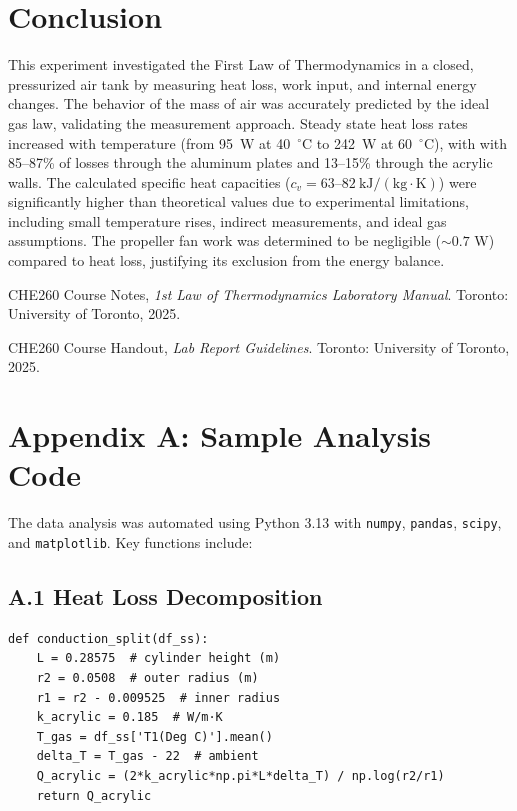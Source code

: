 \documentclass[12pt]{article}
\begin{document}
\section*{Conclusion}
This experiment investigated the First Law of Thermodynamics in a closed, pressurized air tank by measuring heat loss, work input, and internal energy changes.
The behavior of the mass of air was accurately predicted by the ideal gas law, validating the measurement approach.
Steady state heat loss rates increased with temperature (from 95~W at 40~$^{\circ}$C to 242~W at 60~$^{\circ}$C), with with 85--87\% of losses through the aluminum plates and 13--15\% through the acrylic walls.
The calculated specific heat capacities ($c_v = 63$--$82~\mathrm{kJ/(kg \cdot K)}$) were significantly higher than theoretical values due to experimental limitations, including small temperature rises, indirect measurements, and ideal gas assumptions.
The propeller fan work was determined to be negligible ($\sim 0.7$ W) compared to heat loss, justifying its exclusion from the energy balance.


\begin{thebibliography}{9}
CHE260 Course Notes, \textit{1st Law of Thermodynamics Laboratory Manual}. Toronto: University of Toronto, 2025.

CHE260 Course Handout, \textit{Lab Report Guidelines}. Toronto: University of Toronto, 2025.
\end{thebibliography}

\newpage

\appendix

\section*{Appendix A: Sample Analysis Code}

The data analysis was automated using Python 3.13 with \texttt{numpy}, \texttt{pandas}, \texttt{scipy}, and \texttt{matplotlib}. Key functions include:

\subsection*{A.1 Heat Loss Decomposition}

\begin{verbatim}
def conduction_split(df_ss):
    L = 0.28575  # cylinder height (m)
    r2 = 0.0508  # outer radius (m)
    r1 = r2 - 0.009525  # inner radius
    k_acrylic = 0.185  # W/m·K
    T_gas = df_ss['T1(Deg C)'].mean()
    delta_T = T_gas - 22  # ambient
    Q_acrylic = (2*k_acrylic*np.pi*L*delta_T) / np.log(r2/r1)
    return Q_acrylic
\end{verbatim}
\end{document}
